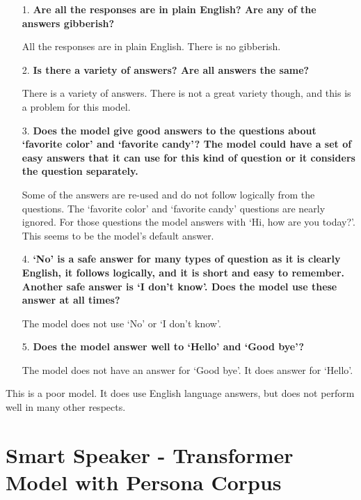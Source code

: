 \begin{itemize}
	\item [1.] \textbf{Are all the responses are in plain English? Are any of the answers gibberish?}
	
	\item []All the responses are in plain English. There is no gibberish.
	
	\item [2.] \textbf{Is there a  variety of answers? Are all answers the same?}
	
	\item []There is a variety of answers. There is not a great variety though, and this is a problem for this model.
	
	\item [3.] \textbf{Does the model give good answers to the questions about `favorite color' and `favorite candy'? The model could have a set of easy answers that it can use for this kind of question or it considers the question separately.} 
	
	\item []Some of the answers are re-used and do not follow logically from the questions. The `favorite color' and `favorite candy' questions are nearly ignored. For those questions the model answers with `Hi, how are you today?'. This seems to be the model's default answer.
	
	\item [4.] \textbf{`No' is a safe answer for many types of question as it is clearly English, it follows logically, and it is short and easy to remember. Another safe answer is `I don't know'. Does the model use these answer at all times?}
	
	\item []The model does not use `No' or `I don't know'.
	
	\item [5.] \textbf{Does the model answer well to `Hello' and `Good bye'?}
	
	\item []The model does not have an answer for `Good bye'. It does answer for `Hello'.
	
\end{itemize}

This is a poor model. It does use English language answers, but does not perform well in many other respects.

\section{Smart Speaker - Transformer Model with Persona Corpus}

